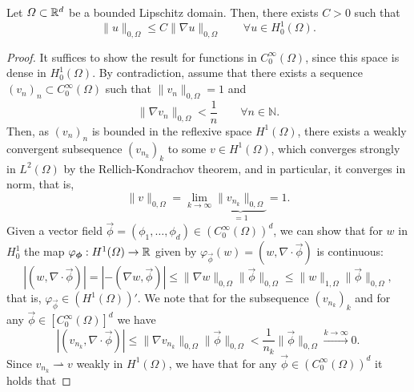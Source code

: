 \begin{lemma}\label{lemma:poincare-inequality}
    Let $\Omega\subset \mathbb{R}^d$ be a bounded Lipschitz domain. Then, there exists $C>0$ such that
    \begin{equation}\label{eq:poincare-inequality}
        \|u\|_{0,\Omega} \leq C\|\nabla u\|_{0,\Omega} \qquad \forall u\in H^1_0(\Omega).
    \end{equation}
    \begin{proof}
        It suffices to show the result for functions in $C_0^\infty(\Omega)$, since this space is dense in $H_0^1(\Omega)$. By contradiction, assume that there exists a sequence $(v_n)_n\subset C_0^\infty(\Omega)$ such that $\|v_n\|_{0,\Omega}=1$ and 
        \begin{equation*}
            \|\nabla v_n\|_{0,\Omega} < \frac{1}{n} \qquad \forall n\in \mathbb{N}.
        \end{equation*}
        Then, as $(v_n)_n$ is bounded in the reflexive space $H^1(\Omega)$, there exists a weakly convergent subsequence $(v_{n_k})_k$ to some $v\in H^1(\Omega)$, which converges strongly in $L^2(\Omega)$ by the Rellich-Kondrachov theorem, and in particular, it converges in norm, that is,
        \begin{equation*}
            \|v\|_{0,\Omega} = \lim_{k\to\infty} \underbrace{\|v_{n_k}\|_{0,\Omega}}_{=1} = 1.
        \end{equation*}
        Given a vector field $\vec\phi = (\phi_1,\dots,\phi_d)\in (C_0^\infty(\Omega))^d$, we can show that for $w$ in $H_0^1$ the map $\varphi_{\vec{\phi}}:H^1(\Omega)\to\R$ given by $\varphi_{\vec{\phi}}(w) = (w, \nabla\cdot \vec \phi)$ is continuous:
        \begin{equation*}
            |(w,\nabla\cdot\vec\phi)| = |-(\nabla w, \vec\phi)| \leq \|\nabla w\|_{0,\Omega}\|\vec\phi\|_{0,\Omega} \leq \|w\|_{1,\Omega}\|\vec\phi\|_{0,\Omega},
        \end{equation*}
        that is, $\varphi_{\vec{\phi}} \in (H^1(\Omega))'$. We note that for the subsequence $(v_{n_k})_k$ and for any $\vec\phi \in [C_0^\infty(\Omega)]^d$ we have 
        \begin{equation*}
            |(v_{n_k},\nabla\cdot\vec\phi)| \leq \|\nabla v_{n_k}\|_{0,\Omega}\|\vec\phi\|_{0,\Omega} < \frac{1}{n_k}\|\vec\phi\|_{0,\Omega}\overset{k\to\infty}{\longrightarrow} 0.
        \end{equation*}
        Since $v_{n_k} \rightharpoonup v$ weakly in $H^1(\Omega)$, we have that for any $\vec\phi \in (C_0^\infty(\Omega))^d$ it holds that

\end{proof}
\end{lemma}
